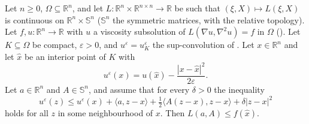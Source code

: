 \begin{lemma}
Let $n\ge0$, $\Omega\subseteq\mathbb R^n$, and let $L:\mathbb R^n\times\mathbb R^{n\times n}\to\mathbb R$ be such that $(\xi,X)\mapsto L(\xi,X)$ is continuous on $\mathbb R^n\times\mathbb S^n$ ($\mathbb S^n$ the symmetric matrices, with the relative topology). Let $f,u:\mathbb R^n\to\mathbb R$ with $u$ a viscosity subsolution of $L(\nabla u,\nabla^2u)=f$ in $\Omega$ (). Let $K\subseteq\Omega$ be compact, $\varepsilon>0$, and $u^\varepsilon=u^\varepsilon_K$ the sup-convolution of . Let $x\in\mathbb R^n$ and let $\hat x$ be an interior point of $K$ with
\[
u^\varepsilon(x)=u(\hat x)-\frac{|x-\hat x|^2}{2\varepsilon}.
\]
Let $a\in\mathbb R^n$ and $A\in\mathbb S^n$, and assume that for every $\delta>0$ the inequality
\[
u^\varepsilon(z)\le u^\varepsilon(x)+\langle a,z-x\rangle+\tfrac12\langle A(z-x),z-x\rangle+\delta|z-x|^2
\]
holds for all $z$ in some neighbourhood of $x$. Then $L(a,A)\le f(\hat x)$.
\end{lemma}
